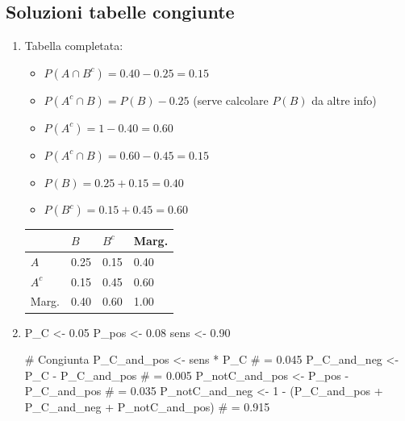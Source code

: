 \documentclass[
  italian,
  letterpaper,
  a4paper,
  11pt,
  open=any]{scrbook}
\newenvironment{Shaded}{\begin{snugshade}}{\end{snugshade}}
\newcommand{\CommentTok}[1]{\textcolor[rgb]{0.37,0.37,0.37}{#1}}
\newcommand{\DecValTok}[1]{\textcolor[rgb]{0.68,0.00,0.00}{#1}}
\newcommand{\FloatTok}[1]{\textcolor[rgb]{0.68,0.00,0.00}{#1}}
\newcommand{\NormalTok}[1]{\textcolor[rgb]{0.00,0.23,0.31}{#1}}
\newcommand{\OtherTok}[1]{\textcolor[rgb]{0.00,0.23,0.31}{#1}}
\newcommand{\SpecialCharTok}[1]{\textcolor[rgb]{0.37,0.37,0.37}{#1}}
\newcounter{none} %
\providecommand{\tightlist}{%
  \setlength{\itemsep}{0pt}\setlength{\parskip}{0pt}}
\theoremstyle{plain}
\theoremstyle{definition}
\theoremstyle{definition}
\theoremstyle{remark}
\begin{document}
\begin{tcolorbox}
\subsection{Soluzioni tabelle
congiunte}\label{soluzioni-tabelle-congiunte}

\begin{enumerate}
\def\labelenumi{\arabic{enumi}.}
\setcounter{enumi}{6}
\item
  Tabella completata:

  \begin{itemize}
  \tightlist
  \item
    \(P(A \cap B^c) = 0.40 - 0.25 = 0.15\)
  \item
    \(P(A^c \cap B) = P(B) - 0.25\) (serve calcolare \(P(B)\) da altre
    info)
  \item
    \(P(A^c) = 1 - 0.40 = 0.60\)
  \item
    \(P(A^c \cap B) = 0.60 - 0.45 = 0.15\)
  \item
    \(P(B) = 0.25 + 0.15 = 0.40\)
  \item
    \(P(B^c) = 0.15 + 0.45 = 0.60\)
  \end{itemize}

  {\def\LTcaptype{none} %
  \begin{longtable}[]{@{}llll@{}}
  \toprule\noalign{}
  & \(B\) & \(B^c\) & Marg. \\
  \midrule\noalign{}
  \endhead
  \bottomrule\noalign{}
  \endlastfoot
  \(A\) & 0.25 & 0.15 & 0.40 \\
  \(A^c\) & 0.15 & 0.45 & 0.60 \\
  Marg. & 0.40 & 0.60 & 1.00 \\
  \end{longtable}
  }
\item
\begin{Shaded}
\begin{Highlighting}[]
\NormalTok{P\_C }\OtherTok{\textless{}{-}} \FloatTok{0.05}
\NormalTok{P\_pos }\OtherTok{\textless{}{-}} \FloatTok{0.08}
\NormalTok{sens }\OtherTok{\textless{}{-}} \FloatTok{0.90}

\CommentTok{\# Congiunta}
\NormalTok{P\_C\_and\_pos }\OtherTok{\textless{}{-}}\NormalTok{ sens }\SpecialCharTok{*}\NormalTok{ P\_C  }\CommentTok{\# = 0.045}
\NormalTok{P\_C\_and\_neg }\OtherTok{\textless{}{-}}\NormalTok{ P\_C }\SpecialCharTok{{-}}\NormalTok{ P\_C\_and\_pos  }\CommentTok{\# = 0.005}
\NormalTok{P\_notC\_and\_pos }\OtherTok{\textless{}{-}}\NormalTok{ P\_pos }\SpecialCharTok{{-}}\NormalTok{ P\_C\_and\_pos  }\CommentTok{\# = 0.035}
\NormalTok{P\_notC\_and\_neg }\OtherTok{\textless{}{-}} \DecValTok{1} \SpecialCharTok{{-}}\NormalTok{ (P\_C\_and\_pos }\SpecialCharTok{+}\NormalTok{ P\_C\_and\_neg }\SpecialCharTok{+}\NormalTok{ P\_notC\_and\_pos)  }\CommentTok{\# = 0.915}


\end{Highlighting}
\end{Shaded}
\end{enumerate}
\end{tcolorbox}
\end{document}

